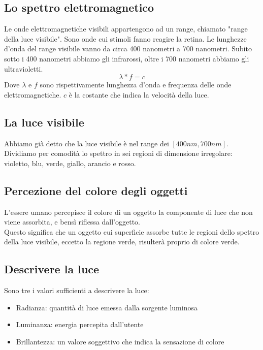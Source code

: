\documentclass{report}
\begin{document}
	\subsection{Lo spettro elettromagnetico}
	Le onde elettromagnetiche visibili appartengono ad un range, chiamato "range della luce visibile". Sono onde cui stimoli fanno reagire la retina.
	Le lunghezze d'onda del range visibile vanno da circa 400 nanometri a 700 nanometri. Subito sotto i 400 nanometri abbiamo gli infrarossi, oltre i 700 nanometri abbiamo gli ultravioletti.
	$$
	\lambda * f = c
	$$
	Dove $\lambda$ e $f$ sono rispettivamente lunghezza d'onda e frequenza delle onde elettromagnetiche. $c$ è la costante che indica la velocità della luce.
	\subsection{La luce visibile}
	Abbiamo già detto che la luce visibile è nel range dei $[400nm,700nm]$.
	Dividiamo per comodità lo spettro in sei regioni di dimensione irregolare: violetto, blu, verde, giallo, arancio e rosso.
	\subsection{Percezione del colore degli oggetti}
	L'essere umano percepisce il colore di un oggetto la componente di luce che non viene assorbita, e bensì riflessa dall'oggetto.\\
	Questo significa che un oggetto cui superficie assorbe tutte le regioni dello spettro della luce visibile, eccetto la regione verde, risulterà proprio di colore verde.
	\subsection{Descrivere la luce}
	Sono tre i valori sufficienti a descrivere la luce:
	\begin{itemize}
		\item Radianza: quantità di luce emessa dalla sorgente luminosa
		\item Luminanza: energia percepita dall'utente
		\item Brillantezza: un valore soggettivo che indica la sensazione di colore
	\end{itemize}
	
\end{document}
